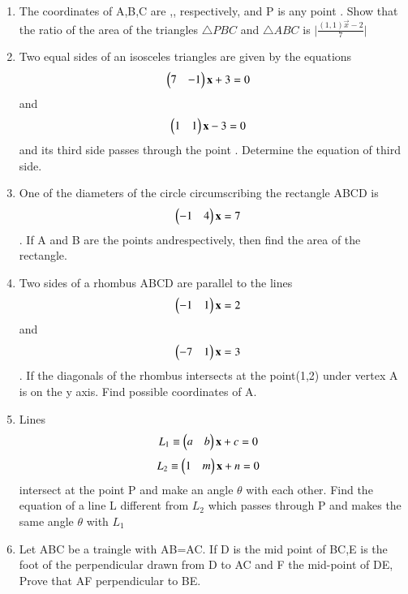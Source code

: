 \begin{enumerate}
    \item The coordinates of A,B,C are ,, respectively, and P is any point . Show that the ratio of the area of the triangles $\triangle PBC$ and $\triangle ABC$ is $\vert {\frac{(1 , 1)\vec {x}-2}{7}}\vert$
    \item Two equal sides of an isosceles triangles are given by the equations \begin{align}\begin{pmatrix}7 & -1\end{pmatrix} \mathbf {x} + 3 &= 0 \end{align} and \begin{align}\begin{pmatrix}1 & 1\end{pmatrix} \mathbf {x} - 3 &= 0 \end{align} and its third side passes through the point . Determine the equation of third side.
    \item One of the diameters of the circle circumscribing the rectangle ABCD is \begin{align}\begin{pmatrix}-1 & 4\end{pmatrix} \mathbf {x}  &= 7 \end{align}. If A and B are the points  andrespectively, then find the area of the rectangle.
    \item Two sides of a rhombus ABCD are parallel to the lines \begin{align}\begin{pmatrix}-1 & 1\end{pmatrix} \mathbf {x}  &= 2 \end{align} and \begin{align}\begin{pmatrix}-7 & 1\end{pmatrix} \mathbf {x}  &= 3 \end{align}. If the diagonals of the rhombus intersects at the point(1,2) under vertex A is on the y axis. Find possible coordinates of A.
    \item Lines \begin{align}L_1\equiv\begin{pmatrix}a & b\end{pmatrix} \mathbf {x} + c &= 0 \end{align} \begin{align}L_2\equiv\begin{pmatrix}1 & m\end{pmatrix} \mathbf {x} + n &= 0 \end{align} intersect at the point P and make an angle $\theta$ with each other. Find the equation of a line L different from $L_2$ which passes through P and makes the same angle $\theta$ with $L_1$
    \item Let ABC be a traingle with AB=AC. If D is the mid point of BC,E is the foot of the perpendicular drawn from D to AC and F the mid-point of DE, Prove that AF perpendicular to BE.

\end{enumerate}
